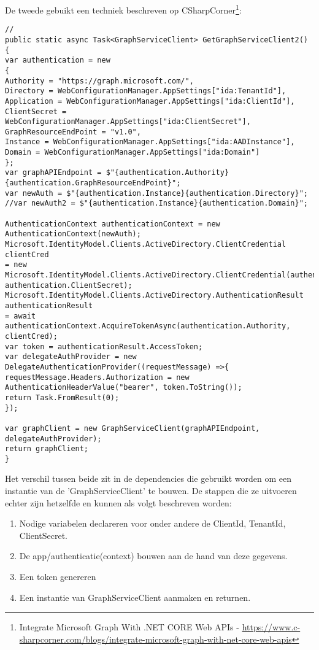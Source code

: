 De tweede gebuikt een techniek beschreven op CSharpCorner\footnote{Integrate Microsoft Graph With .NET CORE Web APIs - \url{https://www.c-sharpcorner.com/blogs/integrate-microsoft-graph-with-net-core-web-apis}}:
\begin{lstlisting}[style=CSharpStyle]
//
public static async Task<GraphServiceClient> GetGraphServiceClient2()
{
var authentication = new
{
Authority = "https://graph.microsoft.com/",
Directory = WebConfigurationManager.AppSettings["ida:TenantId"],
Application = WebConfigurationManager.AppSettings["ida:ClientId"],
ClientSecret = WebConfigurationManager.AppSettings["ida:ClientSecret"],
GraphResourceEndPoint = "v1.0",
Instance = WebConfigurationManager.AppSettings["ida:AADInstance"],
Domain = WebConfigurationManager.AppSettings["ida:Domain"]
};
var graphAPIEndpoint = $"{authentication.Authority}{authentication.GraphResourceEndPoint}";
var newAuth = $"{authentication.Instance}{authentication.Directory}";
//var newAuth2 = $"{authentication.Instance}{authentication.Domain}";

AuthenticationContext authenticationContext = new AuthenticationContext(newAuth);
Microsoft.IdentityModel.Clients.ActiveDirectory.ClientCredential clientCred 
= new Microsoft.IdentityModel.Clients.ActiveDirectory.ClientCredential(authentication.Application, authentication.ClientSecret);
Microsoft.IdentityModel.Clients.ActiveDirectory.AuthenticationResult authenticationResult 
= await authenticationContext.AcquireTokenAsync(authentication.Authority, clientCred);
var token = authenticationResult.AccessToken;
var delegateAuthProvider = new DelegateAuthenticationProvider((requestMessage) =>{
requestMessage.Headers.Authorization = new AuthenticationHeaderValue("bearer", token.ToString());
return Task.FromResult(0);
});

var graphClient = new GraphServiceClient(graphAPIEndpoint, delegateAuthProvider);
return graphClient;
}
\end{lstlisting}

Het verschil tussen beide zit in de dependencies die gebruikt worden om een instantie van de 'GraphServiceClient' te bouwen. De stappen die ze uitvoeren echter zijn hetzelfde en kunnen als volgt beschreven worden:
\begin{enumerate}
    \item Nodige variabelen declareren voor onder andere de ClientId, TenantId, ClientSecret.
    \item De app/authenticatie(context) bouwen aan de hand van deze gegevens.
    \item Een token genereren
    \item Een instantie van GraphServiceClient aanmaken en returnen.
\end{enumerate}

